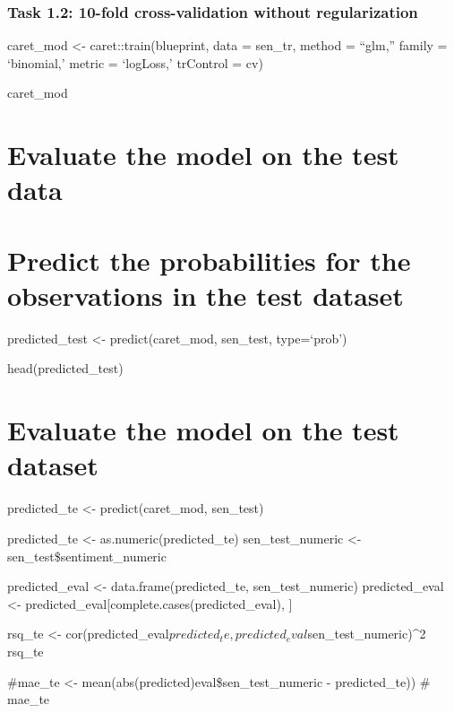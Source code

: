 \documentclass[
  english,
  man]{apa6}
\begin{document}
\hypertarget{task-1.2-10-fold-cross-validation-without-regularization}{%
\subsubsection{Task 1.2: 10-fold cross-validation without regularization}\label{task-1.2-10-fold-cross-validation-without-regularization}}

caret\_mod \textless- caret::train(blueprint,
data = sen\_tr,
method = ``glm,''
family = `binomial,'
metric = `logLoss,'
trControl = cv)

caret\_mod

\hypertarget{evaluate-the-model-on-the-test-data}{%
\section{Evaluate the model on the test data}\label{evaluate-the-model-on-the-test-data}}

\hypertarget{predict-the-probabilities-for-the-observations-in-the-test-dataset}{%
\section{Predict the probabilities for the observations in the test dataset}\label{predict-the-probabilities-for-the-observations-in-the-test-dataset}}

predicted\_test \textless- predict(caret\_mod, sen\_test, type=`prob')

head(predicted\_test)

\hypertarget{evaluate-the-model-on-the-test-dataset}{%
\section{Evaluate the model on the test dataset}\label{evaluate-the-model-on-the-test-dataset}}

predicted\_te \textless- predict(caret\_mod, sen\_test)

predicted\_te \textless- as.numeric(predicted\_te)
sen\_test\_numeric \textless- sen\_test\$sentiment\_numeric

predicted\_eval \textless- data.frame(predicted\_te, sen\_test\_numeric)
predicted\_eval \textless- predicted\_eval{[}complete.cases(predicted\_eval), {]}

rsq\_te \textless- cor(predicted\_eval\(predicted_te,predicted_eval\)sen\_test\_numeric)\^{}2
rsq\_te

\#mae\_te \textless- mean(abs(predicted)eval\$sen\_test\_numeric - predicted\_te))
\# mae\_te
\end{document}
